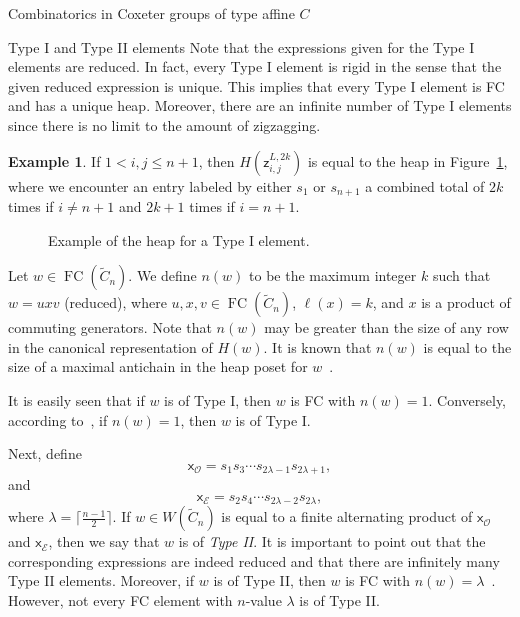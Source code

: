 \documentclass[11pt]{amsart}
\theoremstyle{definition}
\newtheorem{example}[theorem]{Example}
\numberwithin{equation}{section}
\newcommand{\C}{\widetilde{C}}
\renewcommand{\O}{\mathcal{O}}
\newcommand{\E}{\mathcal{E}}
\newcommand{\z}{\mathsf{z}}
\newcommand{\x}{\mathsf{x}}
\renewcommand{\(}{\left(}
\renewcommand{\)}{\right)}
\DeclareMathOperator{\FC}{FC}
\newcommand\xxaxis{0}
\newcommand\yyaxis{90}
\newcommand\heapblock[3]{\fill[draw=black, fill=gray!30, rounded corners, line width=1.1pt, shift={(\xxaxis:#1)},shift={(\yyaxis:#2)}] (-1,-0.5) rectangle (1,0.5);\node at (#1,#2) {\scriptsize $#3$};}
\begin{document}
\begin{section}{Combinatorics in Coxeter groups of type affine $C$}
\begin{subsection}{Type I and Type II elements}
Note that the expressions given for the Type I elements are reduced. In fact, every Type I element is rigid in the sense that the given reduced expression is unique. This implies that every Type I element is FC and has a unique heap.  Moreover, there are an infinite number of Type I elements since there is no limit to the amount of zigzagging. 

\begin{example}
If $1<i,j\leq n+1$, then $H(\z^{L,2k}_{i,j})$ is equal to the heap in Figure~\ref{fig:zigzag}, where we encounter an entry labeled by either $s_{1}$ or $s_{n+1}$ a combined total of $2k$ times if $i\neq n+1$ and $2k+1$ times if $i=n+1$.  
\end{example}

\begin{figure}[!ht]
\caption{Example of the heap for a Type I element.}\label{fig:zigzag} 
\end{figure}

Let $w \in \FC(\C_{n})$.  We define $n(w)$ to be the maximum integer $k$ such that $w = u x v$ (reduced), where $u, x, v \in \FC(\C_{n})$, $\ell(x)=k$, and $x$ is a product of commuting generators.  Note that $n(w)$ may be greater than the size of any row in the canonical representation of $H(w)$.  It is known that $n(w)$ is equal to the size of a maximal antichain in the heap poset for $w$~\cite[Lemma 2.9]{Shi2005}.  

It is easily seen that if $w$ is of Type I, then $w$ is FC with $n(w)=1$. Conversely, according to~\cite[Proposition 3.1.3]{Ernst2010}, if $n(w)=1$, then $w$ is of Type I.

Next, define
\[
\x_{\O}=s_{1}s_{3}\cdots s_{2\lambda-1}s_{2\lambda+1},
\]
and
\[
\x_{\E}=s_{2}s_{4}\cdots s_{2\lambda-2}s_{2\lambda},
\]
where $\lambda=\lceil \frac{n-1}{2}\rceil$.  If $w \in W(\C_n)$ is equal to a finite alternating product of $\x_{\O}$ and $\x_{\E}$, then we say that $w$ is of \emph{Type II}.  It is important to point out that the corresponding expressions are indeed reduced and that there are infinitely many Type II elements.  Moreover, if $w$ is of Type II, then $w$ is FC with $n(w)=\lambda$~\cite[Proposition 3.2.3]{Ernst2010}. However, not every FC element with $n$-value $\lambda$ is of Type II. 


\end{subsection}
\end{section}
\end{document}
